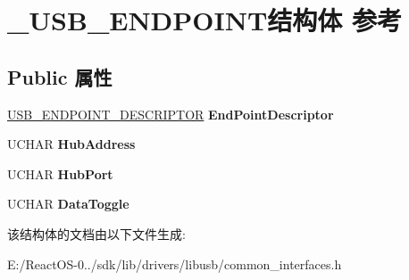 \hypertarget{struct___u_s_b___e_n_d_p_o_i_n_t}{}\section{\+\_\+\+U\+S\+B\+\_\+\+E\+N\+D\+P\+O\+I\+N\+T结构体 参考}
\label{struct___u_s_b___e_n_d_p_o_i_n_t}
\subsection*{Public 属性}
\begin{DoxyCompactItemize}
\item 
\mbox{\label{struct___u_s_b___e_n_d_p_o_i_n_t_a496edc93884665682e71cead6563a5b3}} 
\hyperlink{struct___u_s_b___e_n_d_p_o_i_n_t___d_e_s_c_r_i_p_t_o_r}{U\+S\+B\+\_\+\+E\+N\+D\+P\+O\+I\+N\+T\+\_\+\+D\+E\+S\+C\+R\+I\+P\+T\+OR} {\bfseries End\+Point\+Descriptor}
\item 
\mbox{\label{struct___u_s_b___e_n_d_p_o_i_n_t_a3ae19ec574a1f1af18572415465e54f1}} 
U\+C\+H\+AR {\bfseries Hub\+Address}
\item 
\mbox{\label{struct___u_s_b___e_n_d_p_o_i_n_t_a6bb92d1ba6d7e8e2aa7164242e22fb3f}} 
U\+C\+H\+AR {\bfseries Hub\+Port}
\item 
\mbox{\label{struct___u_s_b___e_n_d_p_o_i_n_t_a738a58b8b62e06a60188dbd6ddee63d9}} 
U\+C\+H\+AR {\bfseries Data\+Toggle}
\end{DoxyCompactItemize}


该结构体的文档由以下文件生成\+:\begin{DoxyCompactItemize}
\item 
E\+:/\+React\+O\+S-\/0../sdk/lib/drivers/libusb/common\+\_\+interfaces.\+h\end{DoxyCompactItemize}
